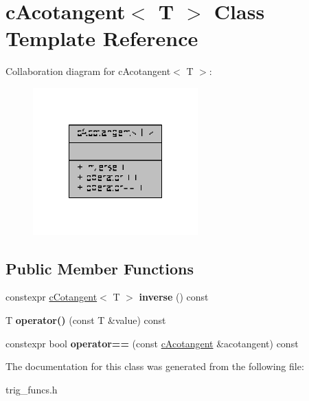 \hypertarget{classcAcotangent}{\section{c\-Acotangent$<$ T $>$ Class Template Reference}
\label{classcAcotangent}
}


Collaboration diagram for c\-Acotangent$<$ T $>$\-:
\nopagebreak
\begin{figure}[H]
\begin{center}
\leavevmode
\includegraphics[width=180pt]{classcAcotangent__coll__graph}
\end{center}
\end{figure}
\subsection*{Public Member Functions}
\begin{DoxyCompactItemize}
\item 
\hypertarget{classcAcotangent_a751094e34ecc63aa18d55c2beebd5db2}{constexpr \hyperlink{classcCotangent}{c\-Cotangent}$<$ T $>$ {\bfseries inverse} () const }\label{classcAcotangent_a751094e34ecc63aa18d55c2beebd5db2}

\item 
\hypertarget{classcAcotangent_a28bde9aa22c5bf8a25cf7fc1fdc34703}{T {\bfseries operator()} (const T \&value) const }\label{classcAcotangent_a28bde9aa22c5bf8a25cf7fc1fdc34703}

\item 
\hypertarget{classcAcotangent_a5c95489c2aac04ef97edc389117e0ce7}{constexpr bool {\bfseries operator==} (const \hyperlink{classcAcotangent}{c\-Acotangent} \&acotangent) const }\label{classcAcotangent_a5c95489c2aac04ef97edc389117e0ce7}

\end{DoxyCompactItemize}


The documentation for this class was generated from the following file\-:\begin{DoxyCompactItemize}
\item 
trig\-\_\-funcs.\-h\end{DoxyCompactItemize}

